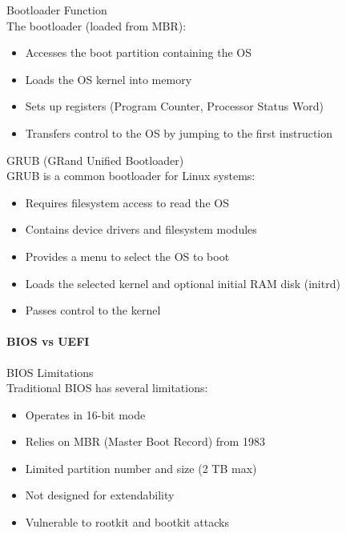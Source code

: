 \begin{definition}{Bootloader Function}\\
    The bootloader (loaded from MBR):
    \begin{itemize}
        \item Accesses the boot partition containing the OS
        \item Loads the OS kernel into memory
        \item Sets up registers (Program Counter, Processor Status Word)
        \item Transfers control to the OS by jumping to the first instruction
    \end{itemize}
\end{definition}

\begin{definition}{GRUB (GRand Unified Bootloader)}\\
    GRUB is a common bootloader for Linux systems:
    \begin{itemize}
        \item Requires filesystem access to read the OS
        \item Contains device drivers and filesystem modules
        \item Provides a menu to select the OS to boot
        \item Loads the selected kernel and optional initial RAM disk (initrd)
        \item Passes control to the kernel
    \end{itemize}
\end{definition}

\multend

\paragraph{BIOS vs UEFI}


\begin{definition}{BIOS Limitations}\\
    Traditional BIOS has several limitations:
    \begin{itemize}
        \item Operates in 16-bit mode
        \item Relies on MBR (Master Boot Record) from 1983
        \item Limited partition number and size (2 TB max)
        \item Not designed for extendability
        \item Vulnerable to rootkit and bootkit attacks
    \end{itemize}
\end{definition}

